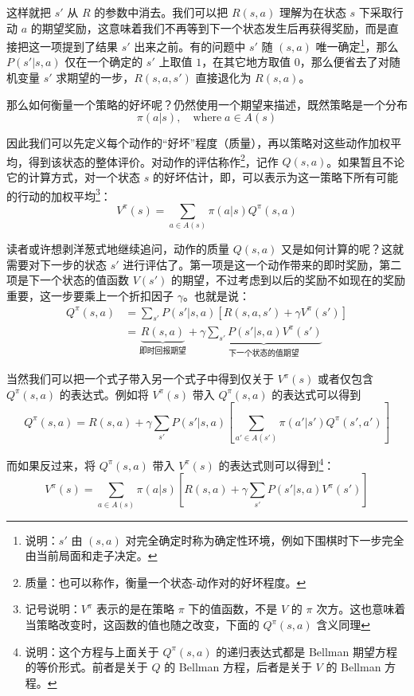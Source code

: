 这样就把 $s'$ 从 $R$ 的参数中消去。我们可以把 $R(s, a)$ 理解为在状态 $s$ 下采取行动 $a$ 的期望奖励，这意味着我们不再等到下一个状态发生后再获得奖励，而是直接把这一项提到了结果 $s'$ 出来之前。有的问题中 $s'$ 随 $(s, a)$ 唯一确定\footnote{说明：$s'$ 由 $(s, a)$ 对完全确定时称为确定性环境，例如下围棋时下一步完全由当前局面和走子决定。}，那么 $P(s' | s, a)$ 仅在一个确定的 $s'$ 上取值 $1$，在其它地方取值 $0$，那么便省去了对随机变量 $s'$ 求期望的一步，$R(s, a, s')$ 直接退化为 $R(s, a)$。

那么如何衡量一个策略的好坏呢？仍然使用一个期望来描述，既然策略是一个分布
\[
    \pi(a | s), \quad \text{where} \; a \in A(s)
\]

因此我们可以先定义每个动作的“好坏”程度（质量），再以策略对这些动作加权平均，得到该状态的整体评价。对动作的评估称作\footnote{质量：也可以称作，衡量一个状态-动作对的好坏程度。}，记作 $Q(s, a)$。如果暂且不论它的计算方式，对一个状态 $s$ 的好坏估计，即，可以表示为这一策略下所有可能的行动的加权平均\footnote{记号说明：$V^\pi$ 表示的是在策略 $\pi$ 下的值函数，不是 $V$ 的 $\pi$ 次方。这也意味着当策略改变时，这函数的值也随之改变，下面的 $Q^\pi (s, a)$ 含义同理}：
\[
    V^\pi (s) = \sum_{a \in A(s)} \pi(a | s) Q^\pi (s, a)
\]

读者或许想剥洋葱式地继续追问，动作的质量 $Q(s, a)$ 又是如何计算的呢？这就需要对下一步的状态 $s'$ 进行评估了。第一项是这一个动作带来的即时奖励，第二项是下一个状态的值函数 $V(s')$ 的期望，不过考虑到以后的奖励不如现在的奖励重要，这一步要乘上一个折扣因子 $\gamma$。也就是说：
\[
\begin{aligned}
    Q^\pi (s, a) &= 
    \sum_{s'} P(s' | s, a) \left[ R(s, a, s') + \gamma V^\pi (s') \right] \\
    &= \underset{\text{即时回报期望}}{\underbrace{R(s, a)}} + \gamma \underset{\text{下一个状态的值期望}}{\underbrace{\sum_{s'} P(s' | s, a) V^\pi (s')}}
\end{aligned}
\]

当然我们可以把一个式子带入另一个式子中得到仅关于 $V^\pi (s)$ 或者仅包含 $Q^\pi (s, a)$ 的表达式。例如将 $V^\pi (s)$ 带入 $Q^\pi (s, a)$ 的表达式可以得到
\[
    Q^\pi (s, a) = R(s, a) + \gamma \sum_{s'} P(s' | s, a) \left[\sum_{a' \in A(s')} \pi(a' | s') Q^\pi (s', a')\right]
\]

而如果反过来，将 $Q^\pi (s, a)$ 带入 $V^\pi (s)$ 的表达式则可以得到\footnote{说明：这个方程与上面关于 $Q^\pi (s, a)$ 的递归表达式都是 Bellman 期望方程的等价形式。前者是关于 $Q$ 的 Bellman 方程，后者是关于 $V$ 的 Bellman 方程。}：
\[
    V^\pi (s) = \sum_{a \in A(s)} \pi(a | s) \left[ R(s, a) + \gamma \sum_{s'} P(s' | s, a) V^\pi (s')\right]
\]

